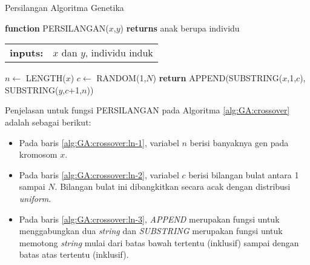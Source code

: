 \begin{algorithm}[H]
	\caption{Persilangan Algoritma Genetika}
	\label{alg:GA:crossover}
	\begin{flushleft}
		\textbf{function} PERSILANGAN($x$,$y$) \textbf{returns} anak berupa individu
		\begin{flushleft}
			\begin{tabular}{ l l }
				\textbf{inputs:}& $x$ dan $y$, individu induk
				\hspace{5pt} 
			\end{tabular} 
		\end{flushleft}
	\end{flushleft}

	\begin{algorithmic}[1]
		\STATE $n \leftarrow$ LENGTH($x$) \label{alg:GA:crossover:ln-1}
		\STATE $c \leftarrow$ RANDOM(1,$N$) \label{alg:GA:crossover:ln-2}
		\STATE \textbf{return} APPEND(SUBSTRING($x$,1,$c$), SUBSTRING($y$,$c$+1,$n$)) \label{alg:GA:crossover:ln-3}
	\end{algorithmic}
\end{algorithm}

Penjelasan untuk fungsi PERSILANGAN pada Algoritma \ref{alg:GA:crossover} adalah sebagai berikut:
\begin{itemize}
	\item Pada baris \ref{alg:GA:crossover:ln-1}, variabel $n$ berisi banyaknya gen pada kromosom $x$.
	\item Pada baris \ref{alg:GA:crossover:ln-2}, variabel $c$ berisi bilangan bulat antara 1 sampai $N$. Bilangan bulat ini dibangkitkan secara acak dengan distribusi \textit{uniform}.
	\item Pada baris \ref{alg:GA:crossover:ln-3}, \textit{APPEND} merupakan fungsi untuk menggabungkan dua \textit{string} dan \textit{SUBSTRING} merupakan fungsi untuk memotong \textit{string} mulai dari batas bawah tertentu (inklusif) sampai dengan batas atas tertentu (inklusif).
\end{itemize}

